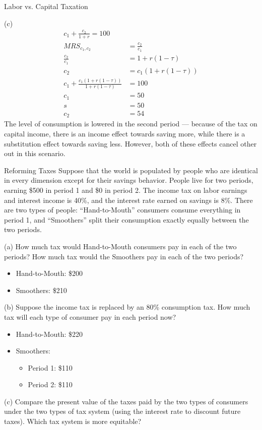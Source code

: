 \documentclass[10pt]{extarticle}
\begin{document}
\begin{problem}{Labor vs. Capital Taxation}
\begin{problem}{(c)}
\begin{align*}
        c_1 + \frac{c_2}{1+r} = 100\\
        MRS_{c_1,c_2} &= \frac{c_2}{c_1}\\
        \frac{c_2}{c_1} &= 1+r(1-\tau)\\
        c_2 &= c_1 (1+r(1-\tau))\\
        c_1 + \frac{c_1(1+r(1-\tau))}{1+r(1-\tau)} &= 100\\
        c_1 &= 50\\
        s &= 50\\
        c_2 &= 54
      \end{align*}
      The level of consumption is lowered in the second period --- because of the tax on capital income, there is an income effect towards saving more, while there is a substitution effect towards saving less. However, both of these effects cancel other out in this scenario.
    \end{problem}
  \end{problem}
  \begin{problem}{Reforming Taxes}
    Suppose that the world is populated by people who are identical in every dimension except for their savings behavior. People live for two periods, earning \$500 in period 1 and \$0 in period 2. The income tax on labor earnings and interest income is 40\%, and the interest rate earned on savings is 8\%. There are two types of people: ``Hand-to-Mouth'' consumers consume everything in period 1, and ``Smoothers'' split their consumption exactly equally between the two periods.
    \tcblower
    \begin{problem}{(a)}
      How much tax would Hand-to-Mouth consumers pay in each of the two periods? How much tax would the Smoothers pay in each of the two periods?
      \tcblower
      \begin{itemize}
        \item Hand-to-Mouth: \$200
        \item Smoothers: \$210
      \end{itemize}
    \end{problem}
    \begin{problem}{(b)}
      Suppose the income tax is replaced by an 80\% consumption tax. How much tax will each type of consumer pay in each period now?
      \tcblower
      \begin{itemize}
        \item Hand-to-Mouth: \$220
        \item Smoothers:
          \begin{itemize}
            \item Period 1: \$110
            \item Period 2: \$110
          \end{itemize}
      \end{itemize}
    \end{problem}
    \begin{problem}{(c)}
      Compare the present value of the taxes paid by the two types of consumers under the two types of tax system (using the interest rate to discount future taxes). Which tax system is more equitable?
    \end{problem}
  \end{problem}
\end{document}
